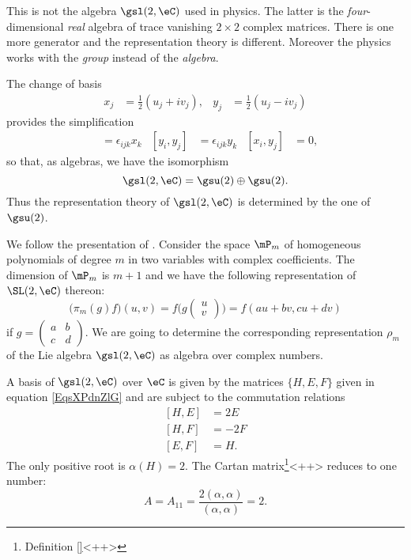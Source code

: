 \begin{remark}
    This is not the algebra \( \gsl(2,\eC)\) used in physics. The latter is the \emph{four}-dimensional \emph{real} algebra of trace vanishing \( 2\times 2\) complex matrices. There is one more generator and the representation theory is different. Moreover the physics works with the \emph{group} instead of the \emph{algebra}.
\end{remark}

The change of basis
\begin{align}
    x_j&=\frac{ 1 }{2}(u_j+iv_j),   &y_j&=\frac{ 1 }{2}(u_j-iv_j)
\end{align}
provides the simplification
\begin{align}
[x_i,x_j]&=\epsilon_{ijk}x_k    &[y_i,y_j]&=\epsilon_{ijk}y_k   &[x_i,y_j]&=0,
\end{align}
so that, as algebras, we have the isomorphism
\begin{equation}
    \gsl(2,\eC)=\gsu(2)\oplus\gsu(2).
\end{equation}
Thus the representation theory of $\gsl(2,\eC)$ is determined by the one of $\gsu(2)$.


We follow the presentation of \cite{GpAlgLie_Faraut}. Consider the space $\mP_m$ of homogeneous polynomials of degree $m$ in two variables with complex coefficients. The dimension of $\mP_m$ is $m+1$ and we have the following representation of $\SL(2,\eC)$ thereon:
\begin{equation}
    \big( \pi_m(g)f \big)(u,v)=f\big( 
g
\begin{pmatrix}
u\\v
\end{pmatrix}
 \big)
=
f(au+bv,cu+dv)
\end{equation}
if $g=\begin{pmatrix}
  a &   b   \\ 
  c &   d   
\end{pmatrix}$. We are going to determine the corresponding representation $\rho_m$ of the Lie algebra $\gsl(2,\eC)$ as algebra over complex numbers. 

A basis of $\gsl(2,\eC)$ over $\eC$ is given by the matrices $\{ H,E,F \}$ given in equation \eqref{EqsXPdnZlG} and are subject to the commutation relations
\begin{subequations}    \label{subEqsSBhuAWx}
    \begin{align}
        [H,E]&=2E\\
        [H,F]&=-2F\\
        [E,F]&=H.
    \end{align}
\end{subequations}
The only positive root is \( \alpha(H)=2\). The Cartan matrix\footnote{Definition \ref{}<++>}<++> reduces to one number: 
\begin{equation}
    A=A_{11}=\frac{ 2(\alpha,\alpha) }{ (\alpha,\alpha) }=2.
\end{equation}

